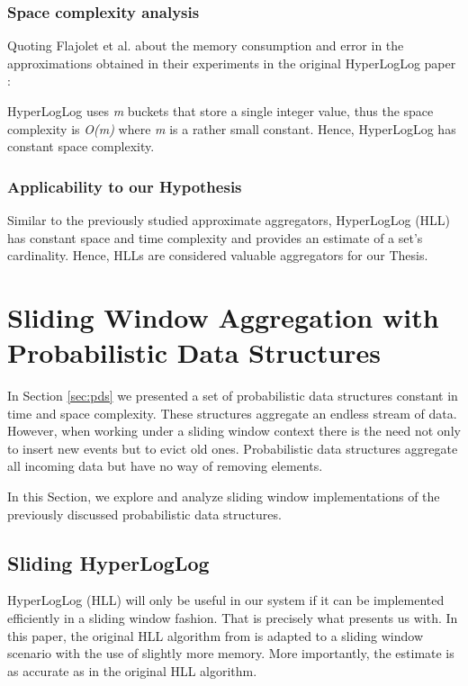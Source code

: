 \subsubsection*{Space complexity analysis}
Quoting Flajolet et al. about the memory consumption and error in the approximations obtained in their experiments in the original HyperLogLog paper \cite{Flajolet-HLL}: 

HyperLogLog uses \textit{m} buckets that store a single integer value, thus the space complexity is \textit{O(m)} where \textit{m} is a rather small constant. Hence, HyperLogLog has constant space complexity.

\subsubsection*{Applicability to our Hypothesis}
Similar to the previously studied approximate aggregators, HyperLogLog (HLL) has constant space and time complexity and provides an estimate of a set's cardinality. Hence, HLLs are considered valuable aggregators for our Thesis.



\iffalse
\section{Sliding Window Aggregation with Probabilistic Data Structures}
In Section \ref{sec:pds} we presented a set of probabilistic data structures constant in time and space complexity. These structures aggregate an endless stream of data. However, when working under a sliding window context there is the need not only to insert new events but to evict old ones. Probabilistic data structures aggregate all incoming data but have no way of removing elements. 

In this Section, we explore and analyze sliding window implementations of the previously discussed probabilistic data structures.

\subsection{Sliding HyperLogLog}
HyperLogLog  (HLL) will only be useful in our system if it can be implemented efficiently in a sliding window fashion. That is precisely what \cite{Chabchoub-Sliding-HLL} presents us with. In this paper, the original HLL algorithm from \cite{Flajolet-HLL} is adapted to a sliding window scenario with the use of slightly more memory. More importantly, the estimate is as accurate as in the original HLL algorithm. 

